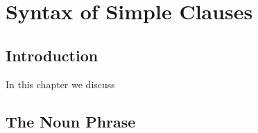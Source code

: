 \chapter{Syntax of Simple Clauses}

\section{Introduction}

In this chapter we discuss 

\section{The Noun Phrase}
